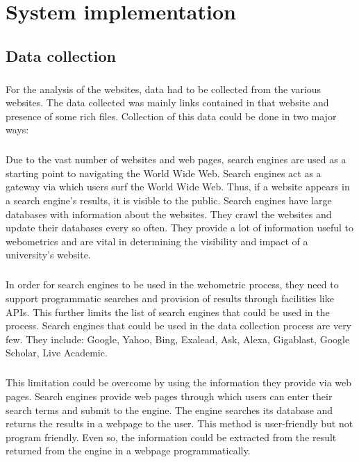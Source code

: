 \chapter{System implementation}
\section{Data collection}
\paragraph{}
For the analysis of the websites, data had to be collected from the various websites. The data collected was mainly links contained in that website and presence of some rich files. Collection of this data could be done in two major ways:
\paragraph{}
Due to the vast number of websites and web pages, search engines are used as a starting point to navigating the World Wide Web. Search engines act as a gateway via which users surf the World
Wide Web. Thus, if a website appears in a search engine's results, it is visible to the public. Search engines have large databases with information about the websites. They crawl the websites and update their databases every so often. They provide a lot of information useful to webometrics and are vital in determining the visibility and impact of a university's website.
\paragraph{}
In order for search engines to be used in the webometric process, they need to support programmatic searches and provision of results through facilities like APIs. This further limits the list of search engines that could be used in the process. Search engines that could be used in the data collection process are very few. They include: Google, Yahoo, Bing, Exalead, Ask, Alexa, Gigablast, Google Scholar, Live Academic.
\paragraph{}
This limitation could be overcome by using the information they provide via web pages. Search engines provide web pages through which users can enter their search terms and submit to the engine. The engine searches its database and returns the results in a webpage to the user. This method is user-friendly but not program friendly. Even so, the information could be extracted from the result returned from the engine in a webpage programmatically.
